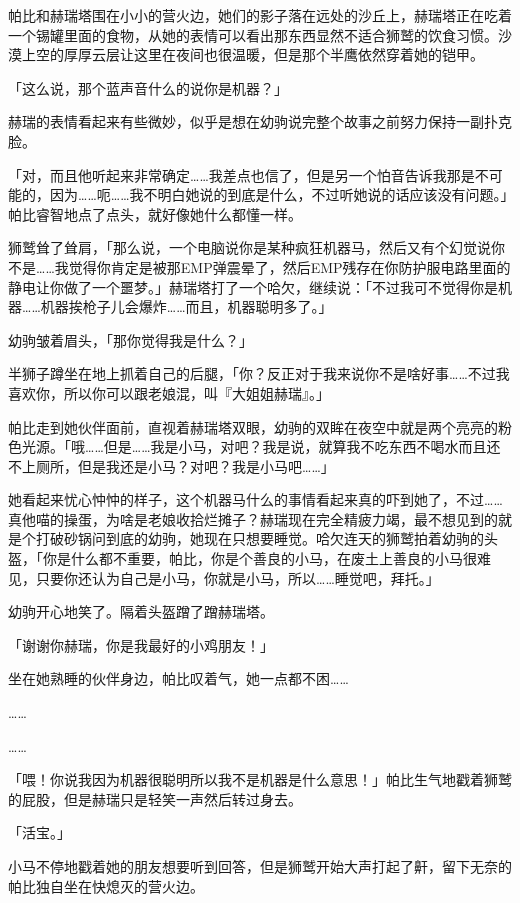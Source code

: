 \horizonline


帕比和赫瑞塔围在小小的营火边，她们的影子落在远处的沙丘上，赫瑞塔正在吃着一个锡罐里面的食物，从她的表情可以看出那东西显然不适合狮鹫的饮食习惯。沙漠上空的厚厚云层让这里在夜间也很温暖，但是那个半鹰依然穿着她的铠甲。

「这么说，那个蓝声音什么的说你是机器？」

赫瑞的表情看起来有些微妙，似乎是想在幼驹说完整个故事之前努力保持一副扑克脸。

「对，而且他听起来非常确定……我差点也信了，但是另一个怕音告诉我那是不可能的，因为……呃……我不明白她说的到底是什么，不过听她说的话应该没有问题。」帕比睿智地点了点头，就好像她什么都懂一样。

狮鹫耸了耸肩，「那么说，一个电脑说你是某种疯狂机器马，然后又有个幻觉说你不是……我觉得你肯定是被那EMP弹震晕了，然后EMP残存在你防护服电路里面的静电让你做了一个噩梦。」赫瑞塔打了一个哈欠，继续说：「不过我可不觉得你是机器……机器挨枪子儿会爆炸……而且，机器聪明多了。」

幼驹皱着眉头，「那你觉得我是什么？」

半狮子蹲坐在地上抓着自己的后腿，「你？反正对于我来说你不是啥好事……不过我喜欢你，所以你可以跟老娘混，叫『大姐姐赫瑞』。」

帕比走到她伙伴面前，直视着赫瑞塔双眼，幼驹的双眸在夜空中就是两个亮亮的粉色光源。「哦……但是……我是小马，对吧？我是说，就算我不吃东西不喝水而且还不上厕所，但是我还是小马？对吧？我是小马吧……」

她看起来忧心忡忡的样子，这个机器马什么的事情看起来真的吓到她了，不过……真他喵的操蛋，为啥是老娘收拾烂摊子？赫瑞现在完全精疲力竭，最不想见到的就是个打破砂锅问到底的幼驹，她现在只想要睡觉。哈欠连天的狮鹫拍着幼驹的头盔，「你是什么都不重要，帕比，你是个善良的小马，在废土上善良的小马很难见，只要你还认为自己是小马，你就是小马，所以……睡觉吧，拜托。」

幼驹开心地笑了。隔着头盔蹭了蹭赫瑞塔。

「谢谢你赫瑞，你是我最好的小鸡朋友！」

坐在她熟睡的伙伴身边，帕比叹着气，她一点都不困……

……

……

「喂！你说我因为机器很聪明所以我不是机器是什么意思！」帕比生气地戳着狮鹫的屁股，但是赫瑞只是轻笑一声然后转过身去。

「活宝。」

小马不停地戳着她的朋友想要听到回答，但是狮鹫开始大声打起了鼾，留下无奈的帕比独自坐在快熄灭的营火边。

